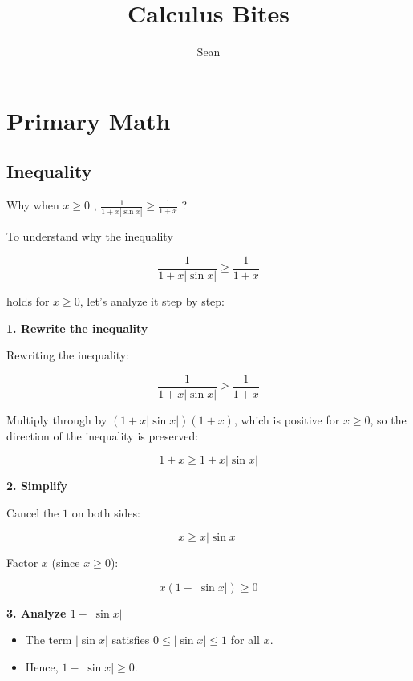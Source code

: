 \documentclass[a4paper,12pt]{book}
\begin{document}
	
\title{Calculus Bites}
\author{Sean}

\maketitle

\tableofcontents

\newpage

\chapter{Primary Math}

\section{Inequality}

\begin{bluebox}
Why when \( x\geq 0\) , \( \frac{1}{1+x|\sin{x}|} \geq \frac{1}{1+x} \) ? %
\end{bluebox}

To understand why the inequality

\[
\frac{1}{1 + x|\sin x|} \geq \frac{1}{1 + x}
\]

holds for \( x \geq 0 \), let's analyze it step by step:

\textbf{1. Rewrite the inequality}

Rewriting the inequality:

\[
\frac{1}{1 + x|\sin x|} \geq \frac{1}{1 + x}
\]

Multiply through by \( (1 + x|\sin x|)(1 + x) \), which is positive for \( x \geq 0 \), so the direction of the inequality is preserved:

\[
1 + x \geq 1 + x|\sin x|
\]

\textbf{2. Simplify}

Cancel the \( 1 \) on both sides:

\[
x \geq x|\sin x|
\]

Factor \( x \) (since \( x \geq 0 \)):

\[
x(1 - |\sin x|) \geq 0
\]

\textbf{3. Analyze \( 1 - |\sin x| \)}

\begin{itemize}
\item 
The term \( |\sin x| \) satisfies \( 0 \leq |\sin x| \leq 1 \) for all \( x \).

\item 
Hence, \( 1 - |\sin x| \geq 0 \).

\end{itemize}
\end{document}
